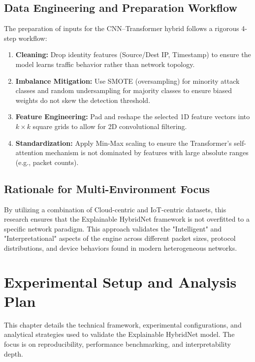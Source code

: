 \documentclass[12pt, a4paper]{report}
\begin{document}
\section{Data Engineering and Preparation Workflow}
The preparation of inputs for the CNN--Transformer hybrid follows a rigorous 4-step workflow:
\begin{enumerate}
    \item \textbf{Cleaning:} Drop identity features (Source/Dest IP, Timestamp) to ensure the model learns traffic behavior rather than network topology.
    \item \textbf{Imbalance Mitigation:} Use SMOTE (oversampling) for minority attack classes and random undersampling for majority classes to ensure biased weights do not skew the detection threshold.
    \item \textbf{Feature Engineering:} Pad and reshape the selected 1D feature vectors into $k \times k$ square grids to allow for 2D convolutional filtering.
    \item \textbf{Standardization:} Apply Min-Max scaling to ensure the Transformer's self-attention mechanism is not dominated by features with large absolute ranges (e.g., packet counts).
\end{enumerate}

\section{Rationale for Multi-Environment Focus}
By utilizing a combination of Cloud-centric and IoT-centric datasets, this research ensures that the Explainable HybridNet framework is not overfitted to a specific network paradigm. This approach validates the "Intelligent" and "Interpretational" aspects of the engine across different packet sizes, protocol distributions, and device behaviors found in modern heterogeneous networks.


\chapter{Experimental Setup and Analysis Plan}
This chapter details the technical framework, experimental configurations, and analytical strategies used to validate the Explainable HybridNet model. The focus is on reproducibility, performance benchmarking, and interpretability depth.
\end{document}
